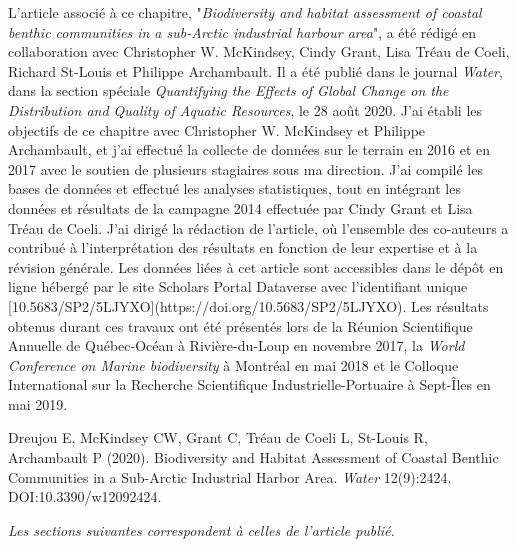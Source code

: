 L'article associé à ce chapitre, "\textit{Biodiversity and habitat assessment of coastal benthic communities in a sub-Arctic industrial harbour area}", a été rédigé en collaboration avec Christopher W. McKindsey, Cindy Grant, Lisa Tréau de Coeli, Richard St-Louis et Philippe Archambault. Il a été publié dans le journal \textit{Water}, dans la section spéciale \textit{Quantifying the Effects of Global Change on the Distribution and Quality of Aquatic Resources}, le 28 août 2020. J'ai établi les objectifs de ce chapitre avec Christopher W. McKindsey et Philippe Archambault, et j'ai effectué la collecte de données sur le terrain en 2016 et en 2017 avec le soutien de plusieurs stagiaires sous ma direction. J'ai compilé les bases de données et effectué les analyses statistiques, tout en intégrant les données et résultats de la campagne 2014 effectuée par Cindy Grant et Lisa Tréau de Coeli. J'ai dirigé la rédaction de l'article, où l'ensemble des co-auteurs a contribué à l'interprétation des résultats en fonction de leur expertise et à la révision générale. Les données liées à cet article sont accessibles dans le dépôt en ligne hébergé par le site Scholars Portal Dataverse avec l'identifiant unique [10.5683/SP2/5LJYXO](https://doi.org/10.5683/SP2/5LJYXO). Les résultats obtenus durant ces travaux ont été présentés lors de la Réunion Scientifique Annuelle de Québec-Océan à Rivière-du-Loup en novembre 2017, la \textit{World Conference on Marine biodiversity} à Montréal en mai 2018 et le Colloque International sur la Recherche Scientifique Industrielle-Portuaire à Sept-Îles en mai 2019.
\linebreak[4]

\begin{singlespace}
Dreujou E, McKindsey CW, Grant C, Tréau de Coeli L, St-Louis R, Archambault P (2020). Biodiversity and Habitat Assessment of Coastal Benthic Communities in a Sub-Arctic Industrial Harbor Area. \textit{Water} 12(9):2424. DOI:10.3390/w12092424.
\end{singlespace}

\textit{Les sections suivantes correspondent à celles de l'article publié.}
